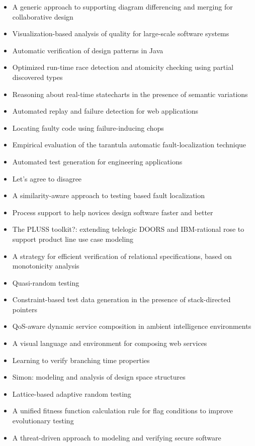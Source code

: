 {\begin{itemize}[itemsep=-1ex]
  \item A generic approach to supporting diagram differencing and merging for collaborative design
  \item Visualization-based analysis of quality for large-scale software systems
  \item Automatic verification of design patterns in Java
  \item Optimized run-time race detection and atomicity checking using partial discovered types
  \item Reasoning about real-time statecharts in the presence of semantic variations
  \item Automated replay and failure detection for web applications
  \item Locating faulty code using failure-inducing chops
  \item Empirical evaluation of the tarantula automatic fault-localization technique
  \item Automated test generation for engineering applications
  \item Let's agree to disagree
  \item A similarity-aware approach to testing based fault localization
  \item Process support to help novices design software faster and better
  \item The PLUSS toolkit?: extending telelogic DOORS and IBM-rational rose to support product line use case modeling
  \item A strategy for efficient verification of relational specifications, based on monotonicity analysis
  \item Quasi-random testing
  \item Constraint-based test data generation in the presence of stack-directed pointers
  \item QoS-aware dynamic service composition in ambient intelligence environments
  \item A visual language and environment for composing web services
  \item Learning to verify branching time properties
  \item Simon: modeling and analysis of design space structures
  \item Lattice-based adaptive random testing
  \item A unified fitness function calculation rule for flag conditions to improve evolutionary testing
  \item A threat-driven approach to modeling and verifying secure software

\end{itemize}}
